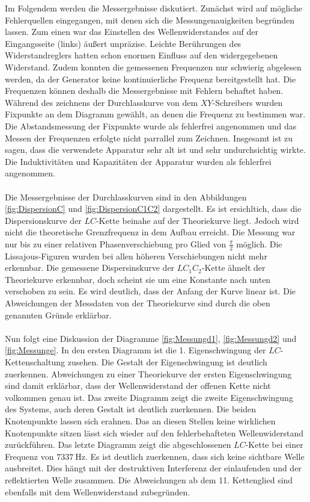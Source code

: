 Im Folgendem werden die Messergebnisse diskutiert.
Zunächst wird auf mögliche Fehlerquellen eingegangen, mit denen sich die Messungenauigkeiten
begründen lassen. Zum einen war das Einstellen des Wellenwiderstandes auf der
Eingangsseite (links) äußert unpräzise. Leichte Berührungen des Widerstandreglers
hatten schon enormen Einfluss auf den widergegebenen Widerstand.
Zudem konnten die gemessenen Frequenzen nur schwierig abgelesen werden, da der
Generator keine kontinuierliche Frequenz bereitgestellt hat. Die Frequenzen
können deshalb die Messergebnisse mit Fehlern behaftet haben.
Während des zeichnens der Durchlasskurve von dem $XY$-Schreibers wurden Fixpunkte
an dem Diagramm gewählt, an denen die Frequenz zu bestimmen war. Die Abstandsmessung
der Fixpunkte wurde als fehlerfrei angenommen und das Messen der Frequenzen
erfolgte nicht parrallel zum Zeichnen.
Insgesamt ist zu sagen, dass die verwendete Apparatur sehr alt ist und sehr
undurchsichtig wirkte.
Die Induktivitäten und Kapazitäten der Apparatur wurden als fehlerfrei angenommen.\\ \\
Die Messergebnisse der Durchlasskurven sind in den Abbildungen \ref{fig:DispersionC}
und \ref{fig:DispersionC1C2} dargestellt. Es ist ersichltich, dass
die Dispersionskurve der $LC$-Kette beinahe auf der Theoriekurve liegt.
Jedoch wird nicht die theoretische Grenzfrequenz in dem Aufbau erreicht.
Die Messung war nur bis zu einer relativen Phasenverschiebung pro Glied von
$\frac{\pi}{2}$ möglich. Die Lissajous-Figuren wurden bei allen höheren
Verschiebungen nicht mehr erkennbar. Die gemessene Dispersinskurve der
$LC_1C_2$-Kette ähnelt der Theoriekurve erkennbar, doch scheint sie um eine
Konstante nach unten verschoben zu sein. Es wird deutlich, dass der Anfang
der Kurve linear ist. Die Abweichungen der Messdaten von der Theoriekurve
sind durch die oben genannten Gründe erklärbar.\\ \\
Nun folgt eine Diskussion der Diagramme \ref{fig:Messungd1}, \ref{fig:Messungd2}
und \ref{fig:Messunge}. In den ersten Diagramm ist die 1. Eigenschwingung der
$LC$-Kettenschaltung zusehen. Die Gestalt der Eigenschwingung ist deutlich
zuerkennen. Abweichungen zu einer Theoriekurve der ersten Eigenschwingung
sind damit erklärbar, dass der Wellenwiderstand der offenen Kette nicht
volkommen genau ist.
Das zweite Diagramm zeigt die zweite Eigenschwingung des Systems, auch deren
Gestalt ist deutlich zuerkennen. Die beiden Knotenpunkte lassen sich erahnen.
Das an diesen Stellen keine wirklichen Knotenpunkte sitzen lässt sich wieder auf
den fehlerbehafteten Wellenwiderstand zurückführen.
Das letzte Diagramm zeigt die abgeschlossenen $LC$-Kette bei einer Frequenz
von $\SI{7337}{\hertz}$. Es ist deutlich zuerkennen, dass sich keine sichtbare
Welle ausbreitet. Dies hängt mit der destruktiven Interferenz der
einlaufenden und der reflektierten Welle zusammen. Die Abweichungen ab dem 11.
Kettenglied sind ebenfalls mit dem Wellenwiderstand zubegründen.




